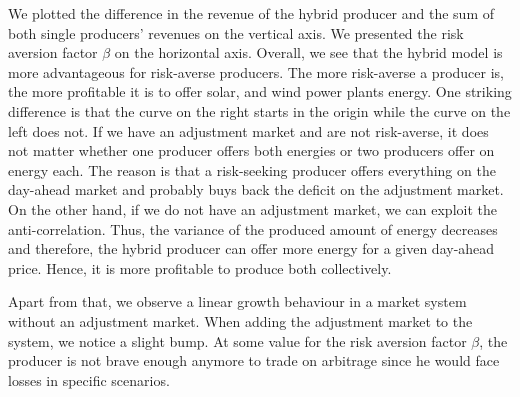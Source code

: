 We plotted the difference in the revenue of the hybrid producer and the sum of both single producers' revenues on the vertical axis. We presented the risk aversion factor $\beta$ on the horizontal axis. Overall, we see that the hybrid model is more advantageous for risk-averse producers. The more risk-averse a producer is, the more profitable it is to offer solar, and wind power plants energy. One striking difference is that the curve on the right starts in the origin while the curve on the left does not. If we have an adjustment market and are not risk-averse, it does not matter whether one producer offers both energies or two producers offer on energy each. The reason is that a risk-seeking producer offers everything on the day-ahead market and probably buys back the deficit on the adjustment market.
On the other hand, if we do not have an adjustment market, we can exploit the anti-correlation. Thus, the variance of the produced amount of energy decreases and therefore, the hybrid producer can offer more energy for a given day-ahead price. Hence, it is more profitable to produce both collectively. 

Apart from that, we observe a linear growth behaviour in a market system without an adjustment market. When adding the adjustment market to the system, we notice a slight bump. At some value for the risk aversion factor $\beta$, the producer is not brave enough anymore to trade on arbitrage since he would face losses in specific scenarios. 